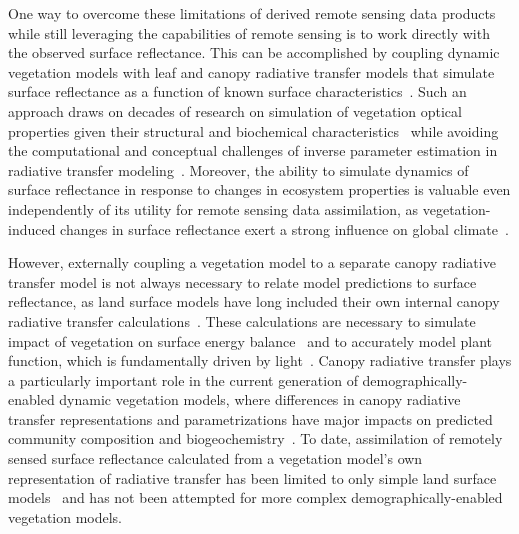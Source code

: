 One way to overcome these limitations of derived remote sensing data products while still leveraging the capabilities of remote sensing is to work directly with the observed surface reflectance.
This can be accomplished by coupling dynamic vegetation models with leaf and canopy radiative transfer models that simulate surface reflectance as a function of known surface characteristics~\citep{knorr2001assimilation, nouvellon2001coupling, quaife2008assimilating}.
Such an approach draws on decades of research on simulation of vegetation optical properties given their structural and biochemical characteristics~\citep{dickinson_1983_land, sellers1985canopy, verhoef1984light, lewis2007spectral, jacquemoud2009prospect, pinty2004synergy, widlowski2007third, widlowski2015fourth, hogan_2018_fast} while avoiding the computational and conceptual challenges of inverse parameter estimation in radiative transfer modeling~\citep{combal2003retrieval, lewis2007spectral}.
Moreover, the ability to simulate dynamics of surface reflectance in response to changes in ecosystem properties is valuable even independently of its utility for remote sensing data assimilation, as vegetation-induced changes in surface reflectance exert a strong influence on global climate~\citep{bonan2008forests, swann2010changes, swann2012midlatitude}.

However, externally coupling a vegetation model to a separate canopy radiative transfer model is not always necessary to relate model predictions to surface reflectance,
as land surface models have long included their own internal canopy radiative transfer calculations~\citep{dickinson1983land, sellers1985canopy}.
These calculations are necessary to simulate impact of vegetation on surface energy balance~\citep{bonan2008forests} and to accurately model plant function, which is fundamentally driven by light~\citep{hikosaka1995model, robakowski_2004_growth, niinemets2016withincanopy, keenan2016global}.
Canopy radiative transfer plays a particularly important role in the current generation of demographically-enabled dynamic vegetation models, where differences in canopy radiative transfer representations and parametrizations have major impacts on predicted community composition and biogeochemistry~\citep{loew_2014_do, fisher2018vegetation, viskari_2019_influence}.
To date, assimilation of remotely sensed surface reflectance calculated from a vegetation model's own representation of radiative transfer has been limited to only simple land surface models~\citep[e.g. SiPNET][]{zobitz_2014_joint} and has not been attempted for more complex demographically-enabled vegetation models.

